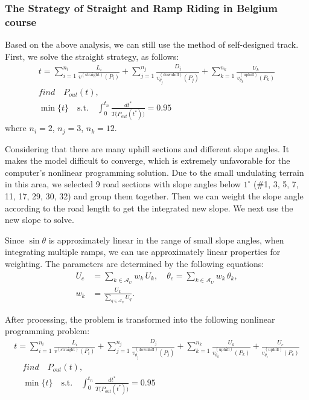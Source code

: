 \documentclass{mcmthesis}
\begin{document}
\subsubsection{The Strategy of Straight and Ramp Riding in Belgium course}
Based on the above analysis, we can still use the method of self-designed track. First, we solve
the straight strategy, as follows:
\begin{equation}
\begin{gathered}
t=\sum_{i=1}^{n_i}\frac{L_i}{v^{(\text{straight})}(P_i)}
 +\sum_{j=1}^{n_j}\frac{D_j}{v^{(\text{downhill})}_{\theta_j}(P_j)}
 +\sum_{k=1}^{n_k}\frac{U_k}{v^{(\text{uphill})}_{\theta_k}(P_k)}\\[4pt]
find \quad P_{out}(t),\\
\min\{t\}\quad\text{s.t.}\quad
\int_0^{t_n}\frac{dt^*}{T\!\bigl(P_{out}(t^*)\bigr)}=0.95
\end{gathered}
\end{equation}
where $n_i = 2$, $n_j = 3$, $n_k = 12$.

Considering that there are many uphill sections and different slope angles. It makes the model
difficult to converge, which is extremely unfavorable for the computer's nonlinear programming
solution. Due to the small undulating terrain in this area, we selected 9 road sections with slope
angles below \(1^\circ\)
(\#1, 3, 5, 7, 11, 17, 29, 30, 32) and group them together. Then we can weight the
slope angle according to the road length to get the integrated new slope. We next use the new slope
to solve.

Since $\sin\theta$ is approximately linear in the range of small slope angles, when integrating multiple ramps, we can use approximately linear properties for weighting. The parameters are determined by the following equations:
\begin{align}
U_{c} &= \sum_{k\in\mathcal{A}_{U}} w_{k}\,U_{k}, \quad \theta_{c}= \sum_{k\in\mathcal{A}_{U}} w_{k}\,\theta_{k}, \label{eq:14}\\[2pt]
w_{k} &= \frac{U_{k}}{\sum_{q\in\mathcal{A}_{U}} U_{q}}. \label{eq:15}
\end{align}

After processing, the problem is transformed into the following nonlinear programming problem:
\begin{equation}
\begin{gathered}
t = \sum_{i=1}^{n_i}\frac{L_i}{v^{(\text{straight})}(P_i)} + \sum_{j=1}^{n_j}\frac{D_j}{v^{(\text{downhill})}_{\theta_j}(P_j)} + \sum_{k=1}^{n_k}\frac{U_k}{v^{(\text{uphill})}_{\theta_k}(P_k)} + \frac{U_c}{v^{(\text{uphill})}_{\theta_c}(P_c)}\\[4pt]
\quad{find }\quad P_{out}(t),\\
\quad\min\{t\}\quad\text{s.t.}\quad \int_0^{t_n}\frac{dt^*}{T\!\bigl(P_{out}(t^*)\bigr)}=0.95 
 \end{gathered}
\end{equation}
\end{document}
